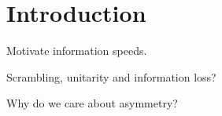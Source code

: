 \section{Introduction} \label{sec:intro}

Motivate information speeds.

Scrambling, unitarity and information loss?

Why do we care about asymmetry?
